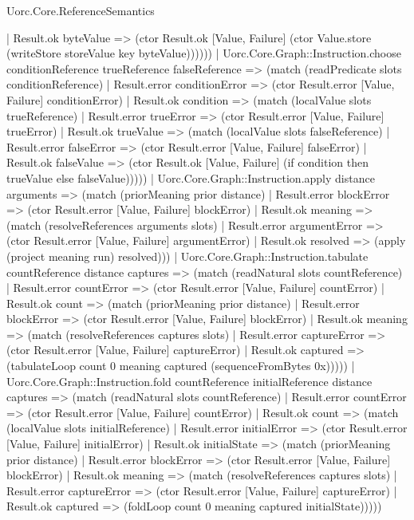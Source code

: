 \begin{lexlean}{Uorc.Core.ReferenceSemantics}
\begin{semanticmodule}
{          | Result.ok byteValue => (ctor Result.ok [Value, Failure] (ctor Value.store (writeStore storeValue key byteValue))))))
    | Uorc.Core.Graph::Instruction.choose conditionReference trueReference falseReference => (match (readPredicate slots conditionReference)
      | Result.error conditionError => (ctor Result.error [Value, Failure] conditionError)
      | Result.ok condition => (match (localValue slots trueReference)
        | Result.error trueError => (ctor Result.error [Value, Failure] trueError)
        | Result.ok trueValue => (match (localValue slots falseReference)
          | Result.error falseError => (ctor Result.error [Value, Failure] falseError)
          | Result.ok falseValue => (ctor Result.ok [Value, Failure] (if condition then trueValue else falseValue)))))
    | Uorc.Core.Graph::Instruction.apply distance arguments => (match (priorMeaning prior distance)
      | Result.error blockError => (ctor Result.error [Value, Failure] blockError)
      | Result.ok meaning => (match (resolveReferences arguments slots)
        | Result.error argumentError => (ctor Result.error [Value, Failure] argumentError)
        | Result.ok resolved => (apply (project meaning run) resolved)))
    | Uorc.Core.Graph::Instruction.tabulate countReference distance captures => (match (readNatural slots countReference)
      | Result.error countError => (ctor Result.error [Value, Failure] countError)
      | Result.ok count => (match (priorMeaning prior distance)
        | Result.error blockError => (ctor Result.error [Value, Failure] blockError)
        | Result.ok meaning => (match (resolveReferences captures slots)
          | Result.error captureError => (ctor Result.error [Value, Failure] captureError)
          | Result.ok captured => (tabulateLoop count 0 meaning captured (sequenceFromBytes 0x)))))
    | Uorc.Core.Graph::Instruction.fold countReference initialReference distance captures => (match (readNatural slots countReference)
      | Result.error countError => (ctor Result.error [Value, Failure] countError)
      | Result.ok count => (match (localValue slots initialReference)
        | Result.error initialError => (ctor Result.error [Value, Failure] initialError)
        | Result.ok initialState => (match (priorMeaning prior distance)
          | Result.error blockError => (ctor Result.error [Value, Failure] blockError)
          | Result.ok meaning => (match (resolveReferences captures slots)
            | Result.error captureError => (ctor Result.error [Value, Failure] captureError)
            | Result.ok captured => (foldLoop count 0 meaning captured initialState)))))
}
\end{semanticmodule}
\end{lexlean}
